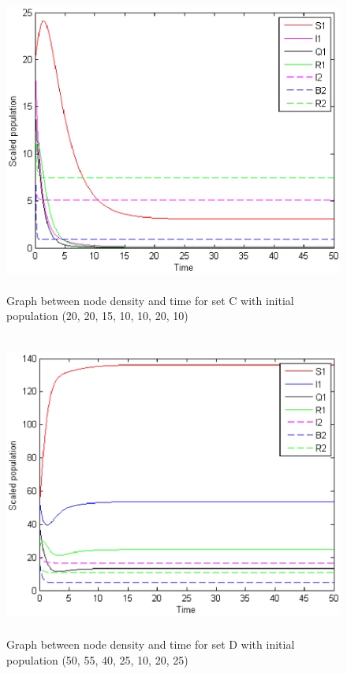 \begin{figure}
\centerline{\includegraphics[width=15cm,height=10cm]{13-DR6}}
\caption{Graph between node density and time for set C with initial population (20, 20, 15, 10, 10, 20, 10)}
\label{fig:13-DR6}
\end{figure}
\begin{figure}
\centerline{\includegraphics[width=15cm,height=10cm]{13-DR5}}
\caption{Graph between node density and time for set D with initial population (50, 55, 40, 25, 10, 20, 25)}
\label{fig:13-DR5}
\end{figure}

